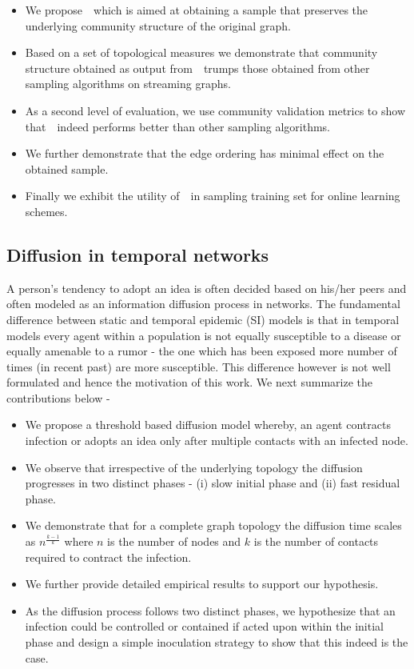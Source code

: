 \begin{itemize}
\item We propose~\compas~which is aimed at obtaining a sample that preserves the underlying community structure of the original graph. 
\item Based on a set of topological measures we demonstrate that community structure obtained as output from~\compas~trumps those obtained from other sampling algorithms on streaming graphs. 
\item As a second level of evaluation, we use community validation metrics to show that~\compas~indeed performs better than other sampling algorithms.
\item We further demonstrate that the edge ordering has minimal effect on the obtained sample. 
\item Finally we exhibit the utility of~\compas~in sampling training set for online learning schemes.
\end{itemize}

\subsection{Diffusion in temporal networks} 
A person's tendency to adopt an idea is often decided based on his/her peers and often modeled as an information diffusion process in networks. 
The fundamental difference between static and temporal epidemic (SI) models is that in temporal models every agent within a population is not equally susceptible to a
disease or equally amenable to a rumor - the one which has been exposed more number of times (in recent past) are more susceptible. This difference however is not well
formulated and hence the motivation of this work. We next summarize the contributions below -  

\begin{itemize}
\item We propose a threshold based diffusion model whereby, an agent contracts infection or adopts an idea only after multiple contacts with an infected node.
\item We observe that irrespective of the underlying topology the diffusion progresses in two distinct phases - (i) slow initial phase and (ii) fast residual phase.
\item We demonstrate that for a complete graph topology the diffusion time scales as $n^{\frac{k-1}{k}}$ where $n$ is the number of nodes and $k$ is the number of contacts required to contract the infection.
\item We further provide detailed empirical results to support our hypothesis.
\item As the diffusion process follows two distinct phases, we hypothesize that an infection could be controlled or contained if acted upon within the initial phase and design a simple inoculation strategy to show that this indeed is the case.
\end{itemize}

